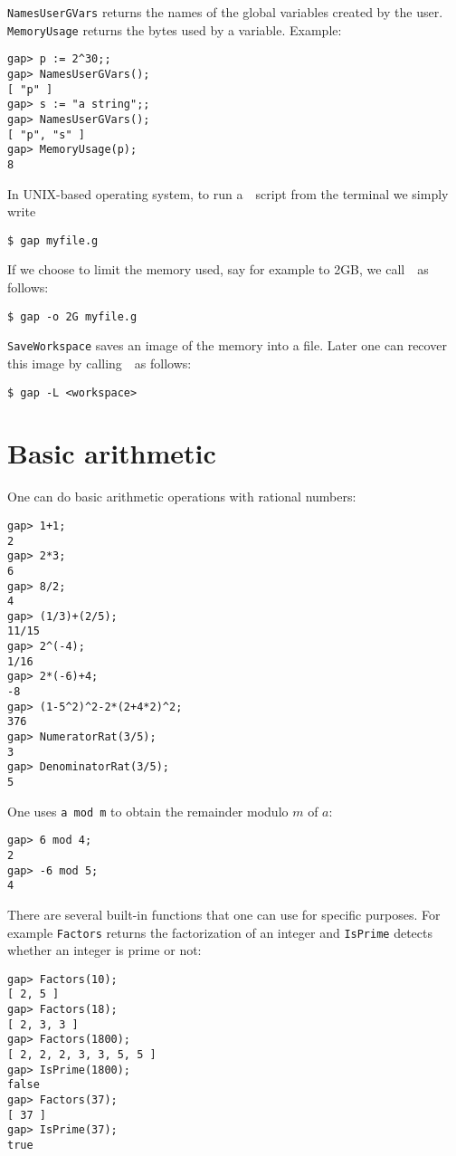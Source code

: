 \lstinline{NamesUserGVars} returns the names 
of the global variables created by the user. \lstinline{MemoryUsage} returns 
the bytes used by a variable. Example:
\begin{lstlisting}
gap> p := 2^30;;
gap> NamesUserGVars();
[ "p" ]
gap> s := "a string";;
gap> NamesUserGVars();
[ "p", "s" ]
gap> MemoryUsage(p);
8
\end{lstlisting}

In UNIX-based operating system, 
to run a~\GAP~script from the terminal we simply write
\begin{lstlisting}
$ gap myfile.g
\end{lstlisting}
If we choose to limit the memory used, say for example to
2GB, we call~\GAP~as follows:
\begin{lstlisting}
$ gap -o 2G myfile.g
\end{lstlisting}


\lstinline{SaveWorkspace} saves an image of the memory into a file.  Later one
can recover this image by calling~\GAP~as follows: 
\begin{lstlisting}
$ gap -L <workspace>
\end{lstlisting}


\section{Basic arithmetic}

One can do basic arithmetic operations with rational numbers:
\begin{lstlisting}
gap> 1+1;
2
gap> 2*3;
6
gap> 8/2;
4
gap> (1/3)+(2/5);
11/15
gap> 2^(-4);
1/16
gap> 2*(-6)+4;
-8
gap> (1-5^2)^2-2*(2+4*2)^2;
376
gap> NumeratorRat(3/5);
3
gap> DenominatorRat(3/5);
5
\end{lstlisting}
One uses \lstinline{a mod m} to obtain the remainder modulo
$m$ of $a$: 
\begin{lstlisting}
gap> 6 mod 4;
2
gap> -6 mod 5;
4
\end{lstlisting}
There are several built-in functions that one can use for specific purposes. For example 
\lstinline{Factors} returns the factorization of an integer and 
\lstinline{IsPrime} detects whether an integer is prime or not:
\begin{lstlisting}
gap> Factors(10);
[ 2, 5 ]
gap> Factors(18);
[ 2, 3, 3 ]
gap> Factors(1800);
[ 2, 2, 2, 3, 3, 5, 5 ]
gap> IsPrime(1800);
false
gap> Factors(37);
[ 37 ]
gap> IsPrime(37);
true
\end{lstlisting}


